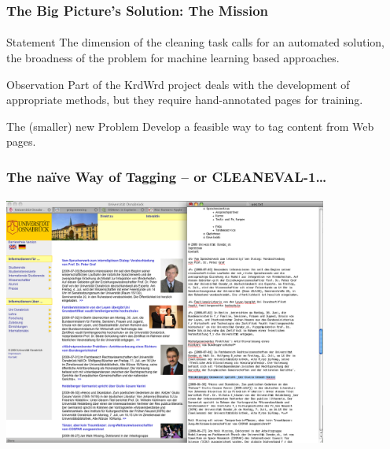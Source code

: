 \documentclass{beamer}
\begin{document}
\begin{frame}
\frametitle{The Big Picture's Solution: The Mission}
\framesubtitle{\hfill {\tiny \cite{krdwrd.org}}}
	
	\begin{block}{Statement}
		The dimension of the cleaning task calls for an automated solution, the broadness of the problem for machine learning based approaches. 
	\end{block}	

\pause
	
	\begin{block}{Observation}
		Part of the KrdWrd project deals with the development of appropriate methods, but they require hand-annotated pages for training.
	\end{block}
	
\pause

	\begin{block}{The (smaller) new Problem}
		Develop a feasible way to tag content from Web pages. 
	\end{block}

\end{frame}


\begin{frame}
\frametitle{The na\"{i}ve Way of Tagging -- or CLEANEVAL-1\ldots}
\framesubtitle{\hfill {\tiny \cite{BaroniChantreeKilgarriffSharoff2008}}}

        \begin{center}
                \includegraphics[width=0.8\textwidth]{20080703_pics/CleanEval.png}
        \end{center}
\end{frame}
\end{document}
